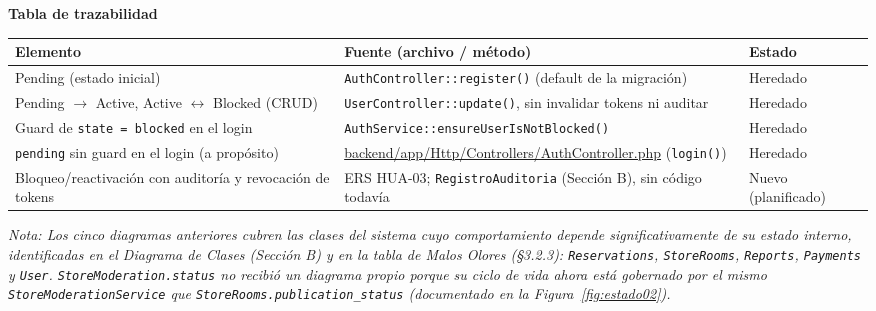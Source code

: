 \bigskip
\noindent\textbf{Tabla de trazabilidad}
\begin{longtable}{|L{4cm}|L{7.5cm}|M{2.3cm}|}
\hline
{} \textbf{Elemento} & \textbf{Fuente (archivo / método)} & \textbf{Estado} \\ \hline
\endhead
Pending (estado inicial) & \texttt{AuthController::register()} (default de la migración) & Heredado \\ \hline
Pending $\to$ Active, Active $\leftrightarrow$ Blocked (CRUD) & \texttt{UserController::update()}, sin invalidar tokens ni auditar & Heredado \\ \hline
Guard de \texttt{state = blocked} en el login & \texttt{AuthService::ensureUserIsNotBlocked()} & Heredado \\ \hline
\texttt{pending} sin guard en el login (a propósito) & \url{backend/app/Http/Controllers/AuthController.php} (\texttt{login()}) & Heredado \\ \hline
Bloqueo/reactivación con auditoría y revocación de tokens & ERS HUA-03; \texttt{RegistroAuditoria} (Sección B), sin código todavía & Nuevo (planificado) \\ \hline
\end{longtable}

\bigskip
\noindent\textit{Nota: Los cinco diagramas anteriores cubren las clases del sistema cuyo comportamiento depende significativamente de su estado interno, identificadas en el Diagrama de Clases (Sección B) y en la tabla de Malos Olores (\S3.2.3): \texttt{Reservations}, \texttt{StoreRooms}, \texttt{Reports}, \texttt{Payments} y \texttt{User}. \texttt{StoreModeration.status} no recibió un diagrama propio porque su ciclo de vida ahora está gobernado por el mismo \texttt{StoreModerationService} que \texttt{StoreRooms.publication\_status} (documentado en la Figura~\ref{fig:estado02}).}
\clearpage
